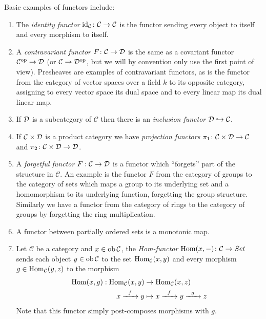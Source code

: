 \documentclass[a4paper,openany]{scrbook}
\renewcommand{\C}{\mathcal C}
\begin{document}
\begin{example}
Basic examples of functors include:
\begin{enumerate}[label=(\alph*)]
\item The \emph{identity functor} $\id_\C\colon \C \to \C$ is the functor sending every object to itself and every morphism to itself.
\item A \emph{contravariant functor} $F\colon \C \to \D$ is the same as a covariant functor $\C^\op \to \D$ (or $\C \to \D^{\op}$, but we will by convention only use the first point of view). Presheaves are examples of contravariant functors, as is the functor from the category of vector spaces over a field $k$ to its opposite category, assigning to every vector space its dual space and to every linear map its dual linear map. 
\item If $\mathcal D$ is a subcategory of $\C$ then there is an \emph{inclusion functor} $\D \hookrightarrow \C$. 
\item If $\C \times \D$ is a product category we have \emph{projection functors} $\pi_1 \colon \C \times \D \to \C$ and $\pi_2 \colon \C \times \D \to \D$.
\item A \emph{forgetful functor} $F:\C \to \D$ is a functor which ``forgets'' part of the structure in $\C$. An example is the functor $F$ from the category of groups to the category of sets which maps a group to its underlying set and a homomorphism to its underlying function, forgetting the group structure. Similarly we have a functor from the category of rings to the category of groups by forgetting the ring multiplication. 
\item A functor between partially ordered sets is a monotonic map.
\item Let $\C$ be a category and $x \in \ob \C$, the \emph{Hom-functor} $\Hom(x, -)\colon\C \to \\Set$ sends each object $y \in \ob \C$ to the set $\Hom_{\C}(x,y)$ and every morphism $g \in \Hom_{\C}(y,z)$ to the morphism 
\begin{align*}
\displaystyle \Hom(x,g): \Hom_{\C}(x,y) &\to \Hom_{\C}(x,z) \\
x \xrightarrow{\hspace{0.2cm} f \hspace{0.2cm}} y &\mapsto x \xrightarrow{\hspace{0.2cm} f \hspace{0.2cm}} y \xrightarrow{\hspace{0.2cm} g \hspace{0.2cm}} z
\end{align*}
Note that this functor simply post-composes morphisms with $g$.
\end{enumerate}
\end{example}
\end{document}
